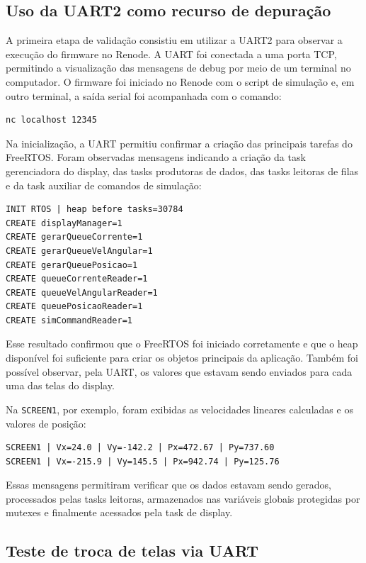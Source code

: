 \documentclass[a4paper,10pt]{article}
\begin{document}
\subsection{Uso da UART2 como recurso de depuração}

A primeira etapa de validação consistiu em utilizar a UART2 para observar a execução do firmware no Renode. A UART foi conectada a uma porta TCP, permitindo a visualização das mensagens de debug por meio de um terminal no computador. O firmware foi iniciado no Renode com o script de simulação e, em outro terminal, a saída serial foi acompanhada com o comando:

\begin{verbatim}
nc localhost 12345
\end{verbatim}

Na inicialização, a UART permitiu confirmar a criação das principais tarefas do FreeRTOS. Foram observadas mensagens indicando a criação da task gerenciadora do display, das tasks produtoras de dados, das tasks leitoras de filas e da task auxiliar de comandos de simulação:

\begin{verbatim}
INIT RTOS | heap before tasks=30784
CREATE displayManager=1
CREATE gerarQueueCorrente=1
CREATE gerarQueueVelAngular=1
CREATE gerarQueuePosicao=1
CREATE queueCorrenteReader=1
CREATE queueVelAngularReader=1
CREATE queuePosicaoReader=1
CREATE simCommandReader=1
\end{verbatim}

Esse resultado confirmou que o FreeRTOS foi iniciado corretamente e que o heap disponível foi suficiente para criar os objetos principais da aplicação. Também foi possível observar, pela UART, os valores que estavam sendo enviados para cada uma das telas do display.

Na \texttt{SCREEN1}, por exemplo, foram exibidas as velocidades lineares calculadas e os valores de posição:

\begin{verbatim}
SCREEN1 | Vx=24.0 | Vy=-142.2 | Px=472.67 | Py=737.60
SCREEN1 | Vx=-215.9 | Vy=145.5 | Px=942.74 | Py=125.76
\end{verbatim}

Essas mensagens permitiram verificar que os dados estavam sendo gerados, processados pelas tasks leitoras, armazenados nas variáveis globais protegidas por mutexes e finalmente acessados pela task de display.

\subsection{Teste de troca de telas via UART}
\end{document}
